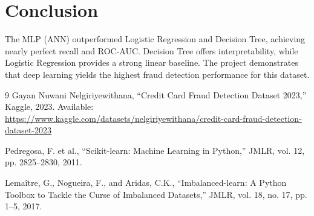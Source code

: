 \documentclass[11pt,a4paper]{article}
\begin{document}
\section{Conclusion}
The MLP (ANN) outperformed Logistic Regression and Decision Tree, achieving nearly perfect recall and ROC-AUC. Decision Tree offers interpretability, while Logistic Regression provides a strong linear baseline. The project demonstrates that deep learning yields the highest fraud detection performance for this dataset.
\newpage
\begin{thebibliography}{9}
Gayan Nuwani Nelgiriyewithana, ``Credit Card Fraud Detection Dataset 2023,'' Kaggle, 2023. Available: \url{https://www.kaggle.com/datasets/nelgiriyewithana/credit-card-fraud-detection-dataset-2023}

Pedregosa, F. et al., ``Scikit-learn: Machine Learning in Python,'' JMLR, vol. 12, pp. 2825–2830, 2011.

Lemaître, G., Nogueira, F., and Aridas, C.K., ``Imbalanced-learn: A Python Toolbox to Tackle the Curse of Imbalanced Datasets,'' JMLR, vol. 18, no. 17, pp. 1–5, 2017.
\end{thebibliography}
\end{document}
